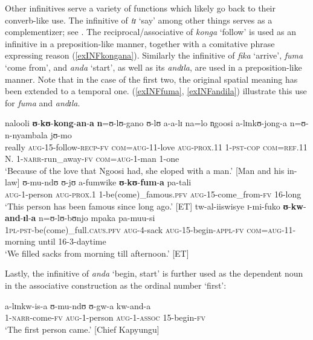 Other infinitives serve a variety of functions which likely go back to their converb-like use. The infinitive of \textit{tɪ} \lq say' among other things serves as a complementizer; see . The reciprocal/associative of \textit{konga} `follow' is used as an infinitive in a preposition-like manner, together with a comitative phrase expressing reason (\ref{exINFkongana}). Similarly the infinitive of \textit{fika} \lq arrive', \textit{fuma} \lq come from', and \textit{anda} \lq start', as well as its  \textit{andɪla}, are used in a preposition-like manner. Note that in the case of the first two, the original spatial meaning has been extended to a temporal one. (\ref{exINFfuma}, \ref{exINFandila}) illustrate this use for \textit{fuma} and \textit{andɪla}.
\begin{exe}
\ex \label{exINFkongana}\gll nalooli \textbf{ʊ}-\textbf{kʊ}-\textbf{kong}-\textbf{an}-\textbf{a} \textbf{n}=ʊ-lʊ-gano ʊ-lʊ a-a-lɪ na=lo n̩goosi a-lɪnkʊ-jong-a n=ʊ-n-nyambala jʊ-mo\\
really \textsc{aug}-15-follow-\textsc{recp}-\textsc{fv} \textsc{com}=\textsc{aug}-11-love \textsc{aug}-\textsc{prox.11} 1-\textsc{pst}-\textsc{cop} \textsc{com}=\textsc{ref.11} N. 1-\textsc{narr}-run\_away-\textsc{fv} \textsc{com}=\textsc{aug}-1-man 1-one\\
\glt `Because of the love that Ngoosi had, she eloped with a man.' [Man and his in-law]
\ex \label{exINFfuma}
\gll ʊ-mu-ndʊ ʊ-jʊ a-fumwike \textbf{ʊ}-\textbf{kʊ}-\textbf{fum}-\textbf{a} pa-tali\\
\textsc{aug}-1-person \textsc{aug}-\textsc{prox.1} 1-be(come)\_famous.\textsc{pfv} \textsc{aug}-15-come\_from-\textsc{fv} 16-long\\
\glt \lq This person has been famous since long ago.' [ET]
\ex \label{exINFandila}
\gll tw-al-iiswisye ɪ-mi-fuko \textbf{ʊ}-\textbf{kw}-\textbf{and}-\textbf{ɪl}-\textbf{a} n=ʊ-lʊ-bʊnjo mpaka pa-muu-si\\
\textsc{1pl}-\textsc{pst}-be(come)\_full.\textsc{caus.pfv} \textsc{aug}-4-sack \textsc{aug}-15-begin-\textsc{appl}-\textsc{fv} \textsc{com}=\textsc{aug}-11-morning until 16-3-daytime\\
\glt \lq We filled sacks from morning till afternoon.' [ET]
\end{exe}%

Lastly, the infinitive of \textit{anda} `begin, start' is further used as the dependent noun in the associative construction as the ordinal number `first':

\begin{exe}
\ex \gll a-lɪnkw-is-a ʊ-mu-ndʊ ʊ-gw-a kw-and-a\\
1-\textsc{narr}-come-\textsc{fv} \textsc{aug}-1-person \textsc{aug}-1-\textsc{assoc} 15-begin-\textsc{fv}\\
\glt `The first person came.' [Chief Kapyungu]
\end{exe}
